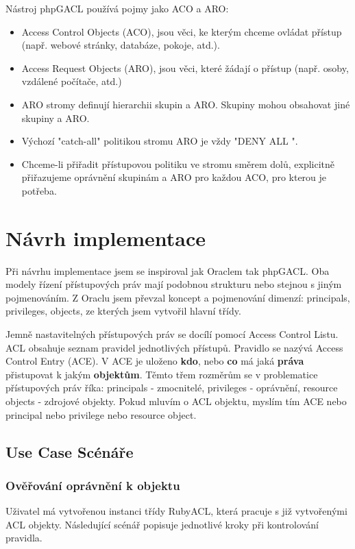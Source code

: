 Nástroj phpGACL používá pojmy jako ACO a ARO:
\begin{itemize}
\item Access Control Objects (ACO), jsou věci, ke kterým chceme ovládat přístup (např. webové stránky, databáze, pokoje, atd.).
\item Access Request Objects (ARO), jsou věci, které žádají o přístup (např. osoby, vzdálené počítače, atd.)
\item ARO stromy definují hierarchii skupin a ARO. Skupiny mohou obsahovat jiné skupiny a ARO.
\item Výchozí "catch-all" politikou stromu ARO je vždy "DENY ALL ".
\item Chceme-li přiřadit přístupovou politiku ve stromu směrem dolů, explicitně přiřazujeme oprávnění skupinám a ARO pro každou ACO, pro kterou je potřeba.
\end{itemize}

\section{Návrh implementace}
Při návrhu implementace jsem se inspiroval jak Oraclem tak phpGACL. Oba modely řízení přístupových práv mají podobnou strukturu nebo stejnou s jiným pojmenováním. Z Oraclu jsem převzal koncept a pojmenování dimenzí: principals, privileges, objects, ze kterých jsem vytvořil hlavní třídy. 

Jemně nastavitelných přístupových práv se docílí pomocí Access Control Listu. ACL obsahuje seznam pravidel jednotlivých přístupů. Pravidlo se nazývá Access Control Entry (ACE). V ACE je uloženo \textbf{kdo}, nebo \textbf{co} má jaká \textbf{práva} přistupovat k jakým \textbf{objektům}. Těmto třem rozměrům se v problematice přístupových práv říka: principals - zmocnitelé, privileges - oprávnění, resource objects - zdrojové objekty. Pokud mluvím o ACL objektu, myslím tím ACE nebo principal nebo privilege nebo resource object.


\subsection{Use Case Scénáře}

\subsubsection{Ověřování oprávnění k objektu}
Uživatel má vytvořenou instanci třídy RubyACL, která pracuje s již vytvořenými ACL objekty. Následující scénář popisuje jednotlivé kroky při kontrolování pravidla.

